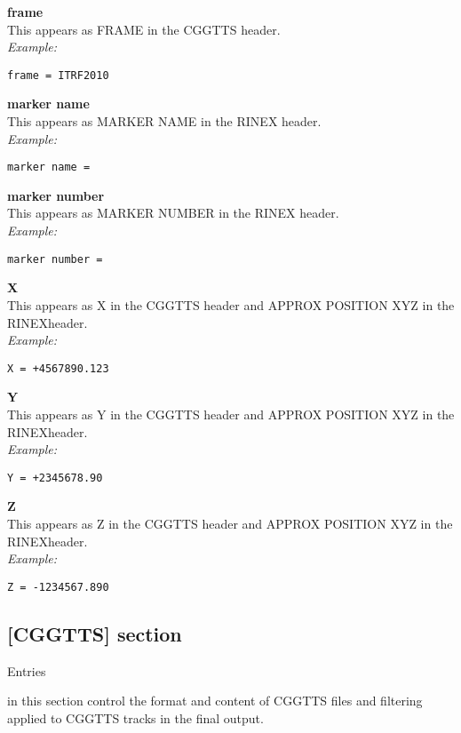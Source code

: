 {\bfseries frame}\\ \hypertarget{h:antenna_frame}{}
This appears as FRAME in the CGGTTS header.\\
\textit{Example:}
\begin{lstlisting}
frame = ITRF2010
\end{lstlisting}

{\bfseries marker name}\\ \hypertarget{h:antenna_marker_name}{}
This appears as MARKER NAME in the RINEX header.\\
\textit{Example:}
\begin{lstlisting}
marker name =
\end{lstlisting}

{\bfseries marker number}\\ \hypertarget{h:antenna_marker_number}{}
This appears as MARKER NUMBER in the RINEX header.\\
\textit{Example:}
\begin{lstlisting}
marker number =
\end{lstlisting}

{\bfseries X}\\ \hypertarget{h:antenna_x}{}
This appears as X in the CGGTTS header and APPROX POSITION XYZ in the RINEXheader.\\
\textit{Example:}
\begin{lstlisting}
X = +4567890.123
\end{lstlisting}

{\bfseries Y}\\ \hypertarget{h:antenna_y}{}
This appears as Y in the CGGTTS header and APPROX POSITION XYZ in the RINEXheader.\\
\textit{Example:}
\begin{lstlisting}
Y = +2345678.90
\end{lstlisting}

{\bfseries Z}\\ \hypertarget{h:antenna_z}{}
This appears as Z in the CGGTTS header and APPROX POSITION XYZ in the RINEXheader.\\
\textit{Example:}
\begin{lstlisting}
Z = -1234567.890 
\end{lstlisting}


\subsection{[CGGTTS] section }

\hypertarget{h:cggtts}{Entries} in this section control the format and content of CGGTTS files 
and filtering applied to CGGTTS tracks in the final output.

